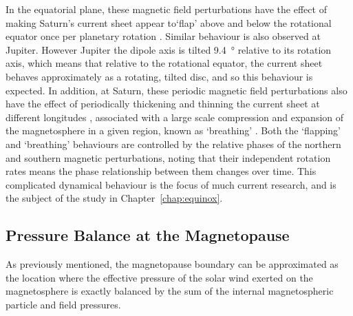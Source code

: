 In the equatorial plane, these magnetic field perturbations have the effect of making Saturn's current sheet appear to`flap' above and below the rotational equator once per planetary rotation \citep[e.g.][]{arridge2011}. Similar behaviour is also observed at Jupiter. However Jupiter the dipole axis is tilted \SI{9.4}{\degree} relative to its rotation axis, which means that relative to the rotational equator, the current sheet behaves approximately as a rotating, tilted disc, and so this behaviour is expected. In addition, at Saturn, these periodic magnetic field perturbations also have the effect of periodically thickening and thinning the current sheet at different longitudes \citep{provan2012}, associated with a large scale compression and expansion of the magnetosphere in a given region, known as `breathing' \citep{ramer2016}. Both the `flapping' and `breathing' behaviours are controlled by the relative phases of the northern and southern magnetic perturbations, noting that their independent rotation rates means the phase relationship between them changes over time. This complicated dynamical behaviour is the focus of much current research, and is the subject of the study in Chapter~\ref{chap:equinox}.

\subsection{Pressure Balance at the Magnetopause}\label{intro:sec:pbalance}
As previously mentioned, the magnetopause boundary can be approximated as the location where the effective pressure of the solar wind exerted on the magnetosphere is exactly balanced by the sum of the internal magnetospheric particle and field pressures. 

